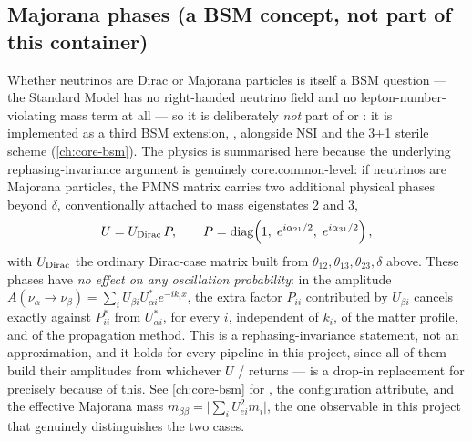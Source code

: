 \begin{theorybox}
\subsection*{Majorana phases (a BSM concept, not part of this container)}
\label{sec:majorana-phases}
Whether neutrinos are Dirac or Majorana particles is itself a BSM question
--- the Standard Model has no right-handed neutrino field and no
lepton-number-violating mass term at all --- so it is deliberately \emph{not}
part of  or : it is implemented as a
third BSM extension, , alongside NSI and the 3+1
sterile scheme (\cref{ch:core-bsm}). The physics is summarised here because
the underlying rephasing-invariance argument is genuinely
core.common-level: if neutrinos are Majorana particles, the PMNS matrix
carries two additional physical phases beyond $\delta$, conventionally
attached to mass eigenstates 2 and 3,
\begin{equation}
  U = U_{\rm Dirac}\,P,
  \qquad
  P = \operatorname{diag}\!\left(1,\;e^{i\alpha_{21}/2},\;e^{i\alpha_{31}/2}\right),
\end{equation}
with $U_{\rm Dirac}$ the ordinary Dirac-case matrix built from
$\theta_{12},\theta_{13},\theta_{23},\delta$ above. These phases have
\emph{no effect on any oscillation probability}: in the amplitude
$A(\nu_\alpha\to\nu_\beta)=\sum_iU_{\beta i}U_{\alpha i}^* e^{-ik_ix}$, the
extra factor $P_{ii}$ contributed by $U_{\beta i}$ cancels exactly against
$P_{ii}^*$ from $U_{\alpha i}^*$, for every $i$, independent of $k_i$, of
the matter profile, and of the propagation method. This is a
rephasing-invariance statement, not an approximation, and it holds for
every pipeline in this project, since all of them build their amplitudes
from whichever $U$ / returns ---
 is a drop-in replacement for 
precisely because of this. See \cref{ch:core-bsm} for
, the  configuration
attribute, and the effective Majorana mass
$m_{\beta\beta}=\bigl|\sum_iU_{ei}^2m_i\bigr|$, the one observable in this
project that genuinely distinguishes the two cases.
\end{theorybox}

